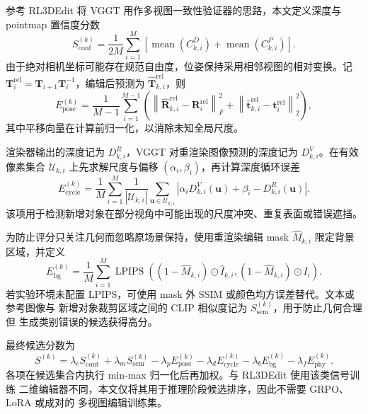 参考 RL3DEdit 将 VGGT 用作多视图一致性验证器的思路\cite{rl3dedit}，本文定义深度与
pointmap 置信度分数
\begin{equation}
  S_{\mathrm{conf}}^{(k)}
  =\frac{1}{2M}\sum_{i=1}^{M}
  \left[
  \operatorname{mean}(C^{D}_{k,i})+
  \operatorname{mean}(C^{P}_{k,i})
  \right].
\end{equation}
由于绝对相机坐标可能存在规范自由度，位姿保持采用相邻视图的相对变换。记
$\mathbf{T}^{\mathrm{rel}}_i=\mathbf{T}_{i+1}\mathbf{T}_i^{-1}$，编辑后预测为
$\hat{\mathbf{T}}^{\mathrm{rel}}_{k,i}$，则
\begin{equation}
  E_{\mathrm{pose}}^{(k)}
  =\frac{1}{M-1}\sum_{i=1}^{M-1}
  \left(
  \left\|\hat{\mathbf{R}}^{\mathrm{rel}}_{k,i}
  -\mathbf{R}^{\mathrm{rel}}_i\right\|_F^2
  +\left\|\hat{\mathbf{t}}^{\mathrm{rel}}_{k,i}
  -\mathbf{t}^{\mathrm{rel}}_i\right\|_2^2
  \right),
\end{equation}
其中平移向量在计算前归一化，以消除未知全局尺度。

渲染器输出的深度记为 $D^{R}_{k,i}$，VGGT 对重渲染图像预测的深度记为
$D^{V}_{k,i}$。在有效像素集合 $\mathcal{U}_{k,i}$ 上先求解尺度与偏移
$(\alpha_i,\beta_i)$，再计算深度循环误差
\begin{equation}
  E_{\mathrm{cycle}}^{(k)}
  =\frac{1}{M}\sum_{i=1}^{M}
  \frac{1}{|\mathcal{U}_{k,i}|}
  \sum_{\mathbf{u}\in\mathcal{U}_{k,i}}
  \left|
  \alpha_i D^{V}_{k,i}(\mathbf{u})+\beta_i
  -D^{R}_{k,i}(\mathbf{u})
  \right|.
\end{equation}
该项用于检测新增对象在部分视角中可能出现的尺度冲突、重复表面或错误遮挡。

为防止评分只关注几何而忽略原场景保持，使用重渲染编辑 mask
$\hat M_{k,i}$ 限定背景区域，并定义
\begin{equation}
  E_{\mathrm{bg}}^{(k)}
  =\frac{1}{M}\sum_{i=1}^{M}
  \operatorname{LPIPS}
  \left((1-\hat M_{k,i})\odot \hat I_{k,i},
  (1-\hat M_{k,i})\odot I_i\right).
\end{equation}
若实验环境未配置 LPIPS，可使用 mask 外 SSIM 或颜色均方误差替代。文本或参考图像与
新增对象裁剪区域之间的 CLIP 相似度记为 $S_{\mathrm{sem}}^{(k)}$，用于防止几何合理但
生成类别错误的候选获得高分。

最终候选分数为
\begin{equation}
  S^{(k)}=
  \lambda_c S_{\mathrm{conf}}^{(k)}
  +\lambda_m S_{\mathrm{sem}}^{(k)}
  -\lambda_p E_{\mathrm{pose}}^{(k)}
  -\lambda_d E_{\mathrm{cycle}}^{(k)}
  -\lambda_b E_{\mathrm{bg}}^{(k)}
  -\lambda_f E_{\mathrm{phy}}^{(k)}.
\end{equation}
各项在候选集合内执行 min-max 归一化后再加权。与 RL3DEdit 使用该类信号训练
二维编辑器不同，本文仅将其用于推理阶段候选排序，因此不需要 GRPO、LoRA 或成对的
多视图编辑训练集。

